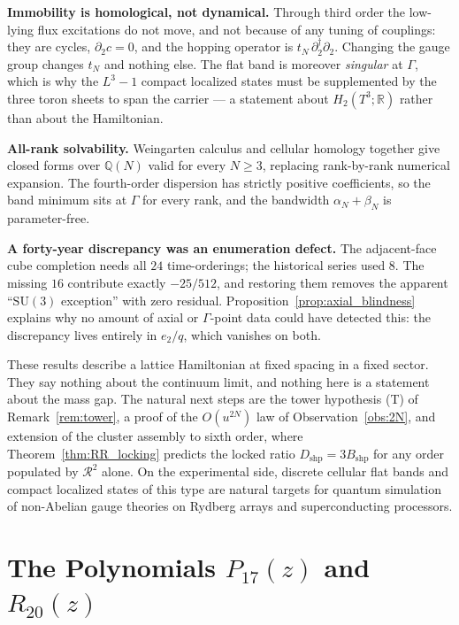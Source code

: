 \documentclass[11pt,a4paper]{article}
\theoremstyle{definition}
\newcommand{\Q}{\mathbb{Q}}
\newcommand{\R}{\mathbb{R}}
\newcommand{\dg}{^{\dagger}}
\newcommand{\SU}{\mathrm{SU}}
\newcommand{\Rc}{\mathcal{R}}          %
\newcommand{\Bshp}{B_{\mathrm{shp}}}
\newcommand{\Dshp}{D_{\mathrm{shp}}}
\begin{document}
\textbf{Immobility is homological, not dynamical.} Through third order the low-lying flux excitations do not move, and not because of any tuning of couplings: they are cycles, $\partial_2c = 0$, and the hopping operator is $t_N\,\partial_2\dg\partial_2$. Changing the gauge group changes $t_N$ and nothing else. The flat band is moreover \emph{singular} at $\Gamma$, which is why the $L^3-1$ compact localized states must be supplemented by the three toron sheets to span the carrier --- a statement about $H_2(T^3;\R)$ rather than about the Hamiltonian.

\textbf{All-rank solvability.} Weingarten calculus and cellular homology together give closed forms over $\Q(N)$ valid for every $N\ge3$, replacing rank-by-rank numerical expansion. The fourth-order dispersion has strictly positive coefficients, so the band minimum sits at $\Gamma$ for every rank, and the bandwidth $\alpha_N+\beta_N$ is parameter-free.

\textbf{A forty-year discrepancy was an enumeration defect.} The adjacent-face cube completion needs all $24$ time-orderings; the historical series used $8$. The missing $16$ contribute exactly $-25/512$, and restoring them removes the apparent ``$\SU(3)$ exception'' with zero residual. Proposition~\ref{prop:axial_blindness} explains why no amount of axial or $\Gamma$-point data could have detected this: the discrepancy lives entirely in $e_2/q$, which vanishes on both.

These results describe a lattice Hamiltonian at fixed spacing in a fixed sector. They say nothing about the continuum limit, and nothing here is a statement about the mass gap. The natural next steps are the tower hypothesis (T) of Remark~\ref{rem:tower}, a proof of the $O(u^{2N})$ law of Observation~\ref{obs:2N}, and extension of the cluster assembly to sixth order, where Theorem~\ref{thm:RR_locking} predicts the locked ratio $\Dshp = 3\Bshp$ for any order populated by $\Rc^2$ alone. On the experimental side, discrete cellular flat bands and compact localized states of this type are natural targets for quantum simulation of non-Abelian gauge theories on Rydberg arrays and superconducting processors.

\appendix

\section{The Polynomials \texorpdfstring{$P_{17}(z)$ and $R_{20}(z)$}{P17(z) and R20(z)}}\label{app:polynomials}
\end{document}
